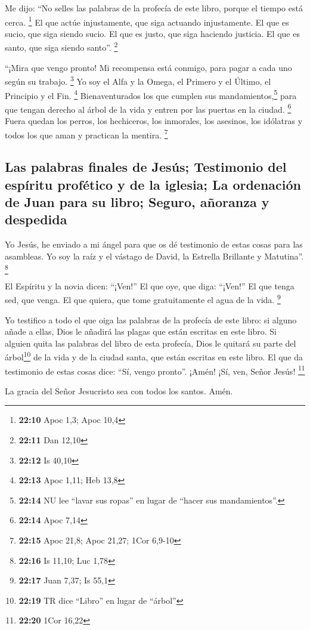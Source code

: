  Me dijo: ``No selles las palabras de la profecía de este
libro, porque el tiempo está cerca. \footnote{\textbf{22:10} Apoc 1,3;
  Apoc 10,4}  El que actúe injustamente, que siga
actuando injustamente. El que es sucio, que siga siendo sucio. El que es
justo, que siga haciendo justicia. El que es santo, que siga siendo
santo''. \footnote{\textbf{22:11} Dan 12,10}

 ``¡Mira que vengo pronto! Mi recompensa está conmigo,
para pagar a cada uno según su trabajo. \footnote{\textbf{22:12} Is
  40,10}  Yo soy el Alfa y la Omega, el Primero y el
Último, el Principio y el Fin. \footnote{\textbf{22:13} Apoc 1,11; Heb
  13,8}  Bienaventurados los que cumplen sus
mandamientos,\footnote{\textbf{22:14} NU lee ``lavar sus ropas'' en
  lugar de ``hacer sus mandamientos''.} para que tengan derecho al árbol
de la vida y entren por las puertas en la ciudad. \footnote{\textbf{22:14}
  Apoc 7,14}  Fuera quedan los perros, los hechiceros,
los inmorales, los asesinos, los idólatras y todos los que aman y
practican la mentira. \footnote{\textbf{22:15} Apoc 21,8; Apoc 21,27;
  1Cor 6,9-10}

\hypertarget{las-palabras-finales-de-jesuxfas-testimonio-del-espuxedritu-profuxe9tico-y-de-la-iglesia-la-ordenaciuxf3n-de-juan-para-su-libro-seguro-auxf1oranza-y-despedida}{%
\subsection{Las palabras finales de Jesús; Testimonio del espíritu
profético y de la iglesia; La ordenación de Juan para su libro; Seguro,
añoranza y
despedida}\label{las-palabras-finales-de-jesuxfas-testimonio-del-espuxedritu-profuxe9tico-y-de-la-iglesia-la-ordenaciuxf3n-de-juan-para-su-libro-seguro-auxf1oranza-y-despedida}}

 Yo Jesús, he enviado a mi ángel para que os dé
testimonio de estas cosas para las asambleas. Yo soy la raíz y el
vástago de David, la Estrella Brillante y Matutina''. \footnote{\textbf{22:16}
  Is 11,10; Luc 1,78}

 El Espíritu y la novia dicen: ``¡Ven!'' El que oye, que
diga: ``¡Ven!'' El que tenga sed, que venga. El que quiera, que tome
gratuitamente el agua de la vida. \footnote{\textbf{22:17} Juan 7,37; Is
  55,1}

 Yo testifico a todo el que oiga las palabras de la
profecía de este libro: si alguno añade a ellas, Dios le añadirá las
plagas que están escritas en este libro.  Si alguien
quita las palabras del libro de esta profecía, Dios le quitará su parte
del árbol\footnote{\textbf{22:19} TR dice ``Libro'' en lugar de
  ``árbol''} de la vida y de la ciudad santa, que están escritas en este
libro.  El que da testimonio de estas cosas dice: ``Sí,
vengo pronto''. ¡Amén! ¡Sí, ven, Señor Jesús! \footnote{\textbf{22:20}
  1Cor 16,22}

 La gracia del Señor Jesucristo sea con todos los santos.
Amén.
